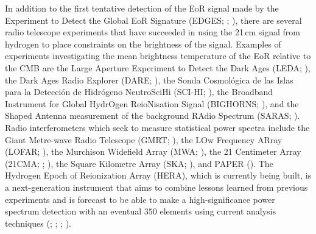 \documentclass[preprint2,numberedappendix,tighten]{aastex6}
\begin{document}
In addition to the first tentative detection of the EoR signal made by the Experiment to Detect the Global EoR Signature (EDGES; \citealt{bowman_et_al2018}; \citealt{bowman2010}), there are several radio telescope experiments that have succeeded in using 
the 21\,cm signal from hydrogen to place constraints on the brightness of the signal. Examples of experiments investigating the 
mean brightness temperature of the EoR relative to the CMB are the Large Aperture Experiment to Detect the Dark Ages (LEDA; \citealt{bernardi_et_al2016}), the 
Dark Ages Radio Explorer (DARE; \citealt{burns2012}), the Sonda Cosmol\'ogica de las Islas para la Detecci\'on de 
Hidr\'ogeno NeutroSciHi (SCI-HI; \citealt{voytek2014}), the Broadband Instrument for Global HydrOgen ReioNisation Signal 
(BIGHORNS; \citealt{sokolowski2015}), and the Shaped Antenna measurement of the background RAdio Spectrum (SARAS; 
\citealt{patra2015}). Radio interferometers which seek to measure statistical power spectra include the Giant Metre-wave 
Radio Telescope (GMRT; \citealt{paciga_et_al2013}), the LOw Frequency ARray (LOFAR; \citealt{van_haarlem_et_al2013}), 
the Murchison Widefield Array (MWA; \citealt{tingay_et_al2013}), the 21 Centimeter Array (21CMA; 
\citealt{peterson_et_al2004}; \citealt{wu2009}), the Square Kilometre Array (SKA; \citealt{koopmans_et_al2015}), and PAPER (\citealt{parsons_et_al2010}). The Hydrogen Epoch of 
Reionization Array (HERA), which is currently being built, is a next-generation instrument that aims to combine lessons 
learned from previous experiments and is forecast to be able to make a high-significance power spectrum 
detection with an eventual $350$ elements using current analysis techniques (\citealt{pober_et_al2014}; \citealt{liu_parsons_2016}; \citealt{dillon_parsons2016}; \citealt{deboer_et_al2017}).
\end{document}
